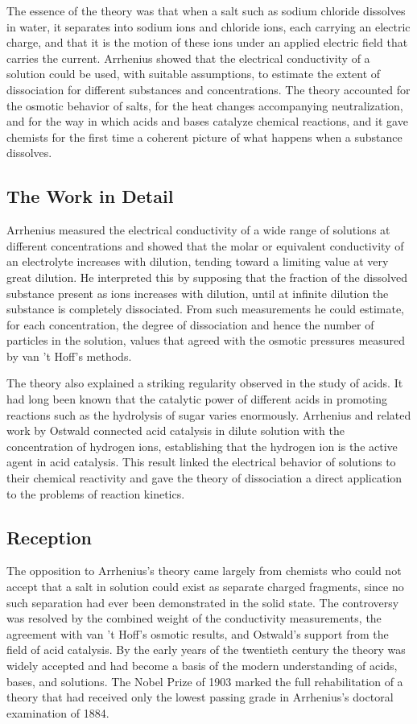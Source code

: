The essence of the theory was that when a salt such as sodium chloride dissolves in water, it separates into sodium ions and chloride ions, each carrying an electric charge, and that it is the motion of these ions under an applied electric field that carries the current. Arrhenius showed that the electrical conductivity of a solution could be used, with suitable assumptions, to estimate the extent of dissociation for different substances and concentrations. The theory accounted for the osmotic behavior of salts, for the heat changes accompanying neutralization, and for the way in which acids and bases catalyze chemical reactions, and it gave chemists for the first time a coherent picture of what happens when a substance dissolves.

\subsection*{The Work in Detail}

Arrhenius measured the electrical conductivity of a wide range of solutions at different concentrations and showed that the molar or equivalent conductivity of an electrolyte increases with dilution, tending toward a limiting value at very great dilution. He interpreted this by supposing that the fraction of the dissolved substance present as ions increases with dilution, until at infinite dilution the substance is completely dissociated. From such measurements he could estimate, for each concentration, the degree of dissociation and hence the number of particles in the solution, values that agreed with the osmotic pressures measured by van 't Hoff's methods.

The theory also explained a striking regularity observed in the study of acids. It had long been known that the catalytic power of different acids in promoting reactions such as the hydrolysis of sugar varies enormously. Arrhenius and related work by Ostwald connected acid catalysis in dilute solution with the concentration of hydrogen ions, establishing that the hydrogen ion is the active agent in acid catalysis. This result linked the electrical behavior of solutions to their chemical reactivity and gave the theory of dissociation a direct application to the problems of reaction kinetics.

\subsection*{Reception}

The opposition to Arrhenius's theory came largely from chemists who could not accept that a salt in solution could exist as separate charged fragments, since no such separation had ever been demonstrated in the solid state. The controversy was resolved by the combined weight of the conductivity measurements, the agreement with van 't Hoff's osmotic results, and Ostwald's support from the field of acid catalysis. By the early years of the twentieth century the theory was widely accepted and had become a basis of the modern understanding of acids, bases, and solutions. The Nobel Prize of 1903 marked the full rehabilitation of a theory that had received only the lowest passing grade in Arrhenius's doctoral examination of 1884.

